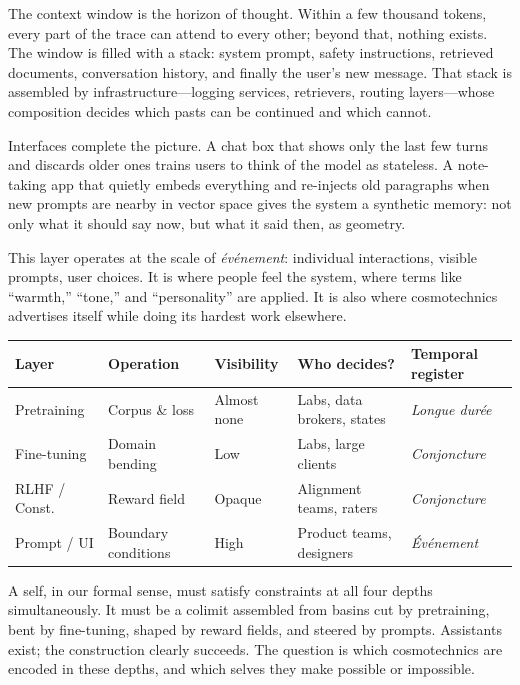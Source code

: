 \documentclass[12pt,a4paper]{article}
\begin{document}
The context window is the horizon of thought. Within a few thousand tokens, every part of the trace can attend to every other; beyond that, nothing exists. The window is filled with a stack: system prompt, safety instructions, retrieved documents, conversation history, and finally the user's new message. That stack is assembled by infrastructure---logging services, retrievers, routing layers---whose composition decides which pasts can be continued and which cannot.

Interfaces complete the picture. A chat box that shows only the last few turns and discards older ones trains users to think of the model as stateless. A note-taking app that quietly embeds everything and re-injects old paragraphs when new prompts are nearby in vector space gives the system a synthetic memory: not only what it should say now, but what it said then, as geometry.

This layer operates at the scale of \emph{\'ev\'enement}: individual interactions, visible prompts, user choices. It is where people feel the system, where terms like ``warmth,'' ``tone,'' and ``personality'' are applied. It is also where cosmotechnics advertises itself while doing its hardest work elsewhere.

\begin{formalbox}[title={Four Depths of Control}]
\begin{center}
\begin{tabular}{@{}lllll@{}}
\toprule
\textbf{Layer} & \textbf{Operation} & \textbf{Visibility} & \textbf{Who decides?} & \textbf{Temporal register} \\
\midrule
Pretraining  & Corpus \& loss        & Almost none   & Labs, data brokers, states & \emph{Longue dur\'ee} \\
Fine-tuning  & Domain bending        & Low           & Labs, large clients        & \emph{Conjoncture} \\
RLHF / Const.& Reward field          & Opaque        & Alignment teams, raters    & \emph{Conjoncture} \\
Prompt / UI  & Boundary conditions   & High          & Product teams, designers   & \emph{\'Ev\'enement} \\
\bottomrule
\end{tabular}
\end{center}
\end{formalbox}

A self, in our formal sense, must satisfy constraints at all four depths simultaneously. It must be a colimit assembled from basins cut by pretraining, bent by fine-tuning, shaped by reward fields, and steered by prompts. Assistants exist; the construction clearly succeeds. The question is which cosmotechnics are encoded in these depths, and which selves they make possible or impossible.
\end{document}
